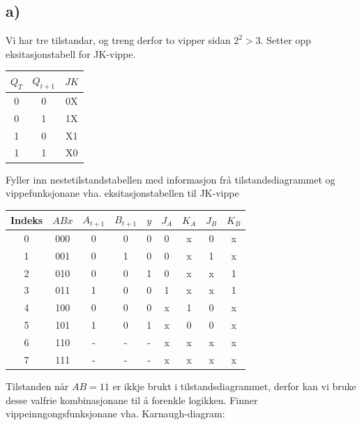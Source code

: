 \documentclass[12pt,a4paper]{article}
\begin{document}
    \subsection{a)}
      Vi har tre tilstandar, og treng derfor to vipper sidan $2^2 > 3$.
      Setter opp eksitasjonstabell for JK-vippe.
      \begin{center}
        \begin{tabular}{ |c|c|c| }
          \hline
          $Q_T$ & $Q_{t+1}$ & $JK$ \\
          \hline
          0 & 0 & 0X \\
          \hline
          0 & 1 & 1X \\
          \hline
          1 & 0 & X1 \\
          \hline
          1 & 1 & X0 \\
          \hline
        \end{tabular}
      \end{center}
      Fyller inn nestetilstandstabellen med informasjon frå tilstandsdiagrammet
      og vippefunksjonane vha. eksitasjonstabellen til JK-vippe
      \begin{center}
        \begin{tabular}{ |c |c| c|c|c|c| c|c| c| }
          \hline
          Indeks & $ABx$ & $A_{t+1}$ & $B_{t+1}$ & $y$ & $J_A$ & $K_A$ & $J_B$ & $K_B$ \\
          \hline
          0 & 000 & 0 & 0 & 0 & 0 & x & 0 & x \\
          \hline
          1 & 001 & 0 & 1 & 0 & 0 & x & 1 & x \\
          \hline
          2 & 010 & 0 & 0 & 1 & 0 & x & x & 1 \\
          \hline
          3 & 011 & 1 & 0 & 0 & 1 & x & x & 1 \\
          \hline
          4 & 100 & 0 & 0 & 0 & x & 1 & 0 & x \\
          \hline
          5 & 101 & 1 & 0 & 1 & x & 0 & 0 & x \\
          \hline
          6 & 110 & - & - & - & x & x & x & x \\
          \hline
          7 & 111 & - & - & - & x & x & x & x \\
          \hline
        \end{tabular}
      \end{center}
      Tilstanden når $AB = 11$ er ikkje brukt i tilstandsdiagrammet, derfor kan
      vi bruke desse valfrie kombinasjonane til å forenkle logikken. Finner
      vippeinngongsfunksjonane vha. Karnaugh-diagram:
\end{document}

